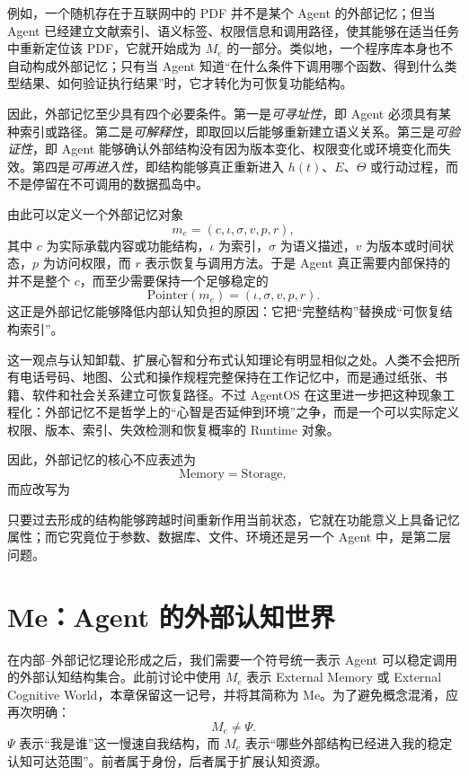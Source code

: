 例如，一个随机存在于互联网中的 PDF 并不是某个 Agent 的外部记忆；但当 Agent 已经建立文献索引、语义标签、权限信息和调用路径，使其能够在适当任务中重新定位该 PDF，它就开始成为 \(M_e\) 的一部分。类似地，一个程序库本身也不自动构成外部记忆；只有当 Agent 知道``在什么条件下调用哪个函数、得到什么类型结果、如何验证执行结果''时，它才转化为可恢复功能结构。

因此，外部记忆至少具有四个必要条件。第一是\emph{可寻址性}，即 Agent 必须具有某种索引或路径。第二是\emph{可解释性}，即取回以后能够重新建立语义关系。第三是\emph{可验证性}，即 Agent 能够确认外部结构没有因为版本变化、权限变化或环境变化而失效。第四是\emph{可再进入性}，即结构能够真正重新进入 \(h(t)\)、\(E\)、\(\Theta\) 或行动过程，而不是停留在不可调用的数据孤岛中。

由此可以定义一个外部记忆对象
\[
m_e
=
(c,\iota,\sigma,v,p,r),
\]
其中 \(c\) 为实际承载内容或功能结构，\(\iota\) 为索引，\(\sigma\) 为语义描述，\(v\) 为版本或时间状态，\(p\) 为访问权限，而 \(r\) 表示恢复与调用方法。于是 Agent 真正需要内部保持的并不是整个 \(c\)，而至少需要保持一个足够稳定的
\[
\mathrm{Pointer}(m_e)
=
(\iota,\sigma,v,p,r).
\]
这正是外部记忆能够降低内部认知负担的原因：它把``完整结构''替换成``可恢复结构索引''。

这一观点与认知卸载、扩展心智和分布式认知理论有明显相似之处。人类不会把所有电话号码、地图、公式和操作规程完整保持在工作记忆中，而是通过纸张、书籍、软件和社会关系建立可恢复路径。不过 AgentOS 在这里进一步把这种现象工程化：外部记忆不是哲学上的``心智是否延伸到环境''之争，而是一个可以实际定义权限、版本、索引、失效检测和恢复概率的 Runtime 对象。

因此，外部记忆的核心不应表述为
\[
\mathrm{Memory}=\mathrm{Storage},
\]
而应改写为
\begin{statementbox}
\centering
{}
\end{statementbox}
只要过去形成的结构能够跨越时间重新作用当前状态，它就在功能意义上具备记忆属性；而它究竟位于参数、数据库、文件、环境还是另一个 Agent 中，是第二层问题。

\section{Me：Agent 的外部认知世界}

在内部--外部记忆理论形成之后，我们需要一个符号统一表示 Agent 可以稳定调用的外部认知结构集合。此前讨论中使用 \(M_e\) 表示 External Memory 或 External Cognitive World，本章保留这一记号，并将其简称为 Me。为了避免概念混淆，应再次明确：
\[
M_e\neq \Psi.
\]
\(\Psi\) 表示``我是谁''这一慢速自我结构，而 \(M_e\) 表示``哪些外部结构已经进入我的稳定认知可达范围''。前者属于身份，后者属于扩展认知资源。

